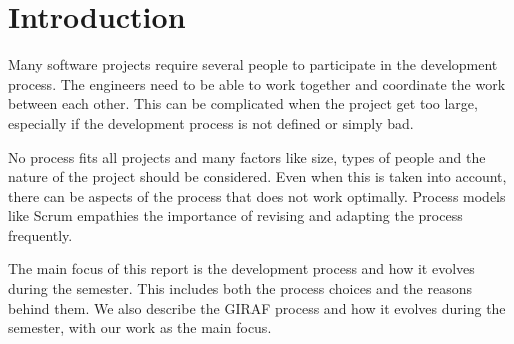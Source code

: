 \section{Introduction}

Many software projects require several people to participate in the development process. The engineers need to be able to work together and coordinate the work between each other. This can be complicated when the project get too large, especially if the development process is not defined or simply bad.

No process fits all projects and many factors like size, types of people and the nature of the project should be considered. Even when this is taken into account, there can be aspects of the process that does not work optimally. Process models like \gls{Scrum} empathies the importance of revising and adapting the process frequently\cite{Scrum}.

The main focus of this report is the development process and how it evolves during the semester. This includes both the process choices and the reasons behind them. We also describe the GIRAF process and how it evolves during the semester, with our work as the main focus.
